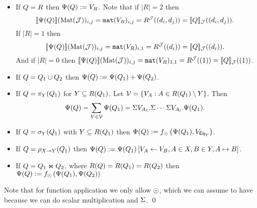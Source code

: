 \begin{itemize}
  \item If $Q = R$ then $\Psi (Q):=V_R$. Note that if $|R|=2$ then 
    $$\llbracket \Psi(Q) \rrbracket(\text{Mat}(\mathcal{J}))_{i,j}=\texttt{mat}(V_R)_{i,j} = R^{\mathcal{J}}((d_i, d_j))=\llbracket Q \rrbracket_{\mathcal{J}}((d_i, d_j)).$$ 
    If $|R|=1$ then 
    $$\llbracket \Psi(Q) \rrbracket(\text{Mat}(\mathcal{J}))_{i,j}=\texttt{mat}(V_R)_{i,1} = R^{\mathcal{J}}((d_i))=\llbracket Q \rrbracket_{\mathcal{J}}((d_i)).$$
    And if $|R|=0$ then 
    $\llbracket \Psi(Q) \rrbracket(\text{Mat}(\mathcal{J}))_{i,j}=\texttt{mat}(V_R)_{1,1} = R^{\mathcal{J}}((1))=\llbracket Q \rrbracket_{\mathcal{J}}((1))$.
  \item If $Q=Q_1\cup Q_2$ then $\Psi(Q):=\Psi(Q_1)+\Psi(Q_2)$.
  \item If $Q = \pi_{Y}(Q_1)$ for $Y\subseteq R(Q_1)$. Let $\mathcal{V} = \lbrace V_A:A\in R(Q_1)\setminus Y \rbrace$. 
    Then
    $$
    \Psi(Q) = \sum_{V\in\mathcal{V}} \Psi(Q_1) = \Sigma V_{A_1}. \Sigma \cdots \Sigma V_{A_{l}}. \Psi(Q_1).
    $$
  \item If $Q = \sigma_Y(Q_1)$ with $Y\subseteq R(Q_1)$ then 
    $\Psi(Q):=f_{\odot}\left( \Psi(Q_1), V_{\mathsf{Eq}_Y} \right)$.
  \item If $Q = \rho_{X\rightarrow Y}(Q_1)$ then $\Psi (Q):= \Psi (Q_1)\left[ V_A\gets V_B, A\in X, B\in Y, A \mapsto B \right]$.
  \item If $Q = Q_1\Join Q_2$, where $R(Q)=R(Q_1)=R(Q_2)$ then 
    $\Psi (Q):=f_{\odot}\left( \Psi (Q_1), \Psi (Q_2) \right)$
\end{itemize}

Note that for function application we only allow $\odot$, 
which we can assume to have because we can do scalar multiplication and $\Sigma$.
\qed